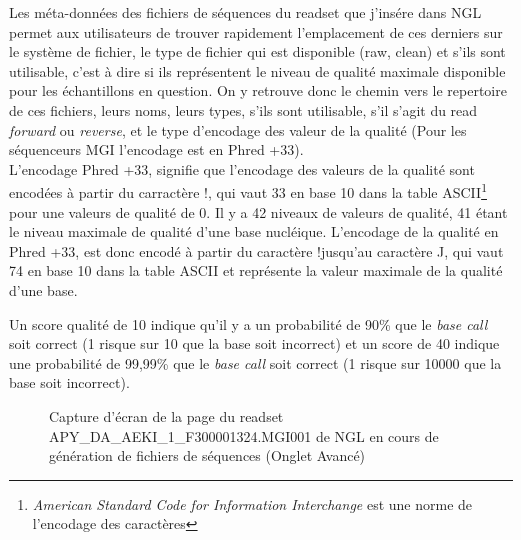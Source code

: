 Les méta-données des fichiers de séquences du readset que j'insére dans NGL permet aux utilisateurs de trouver rapidement l'emplacement de ces derniers sur le système de fichier, le type de fichier qui est disponible (\og raw\fg{}, \og clean\fg{}) et s'ils sont \og utilisable\fg{}, c'est à dire si ils représentent le niveau de qualité maximale disponible pour les échantillons en question.
On y retrouve donc le chemin vers le repertoire de ces fichiers, leurs noms, leurs types, s'ils sont utilisable, s'il s'agit du read \emph{forward} ou \emph{reverse}, et le type d'encodage des valeur de la qualité (Pour les séquenceurs MGI l'encodage est en Phred +33).\\

L'encodage Phred +33, signifie que l'encodage des valeurs de la qualité sont encodées à partir du carractère \og !\fg{}, qui vaut 33 en base 10 dans la table ASCII\footnote{\emph{American Standard Code for Information Interchange} est une norme de l'encodage des caractères} pour une valeurs de qualité de 0. Il y a 42 niveaux de valeurs de qualité, 41 étant le niveau maximale de qualité d'une base nucléique. L'encodage de la qualité en Phred +33, est donc encodé à partir du caractère \og !\fg jusqu'au caractère \og J\fg{}, qui vaut 74 en base 10 dans la table ASCII et représente la valeur maximale de la qualité d'une base.

Un score qualité de 10 indique qu'il y a un probabilité de 90\% que le \emph{base call} soit correct (1 risque sur 10 que la base soit incorrect) et un score de 40 indique une probabilité de 99,99\% que le \emph{base call} soit correct (1 risque sur 10000 que la base soit incorrect).

\begin{figure}[H]
    \centering
    \caption{\footnotesize{Capture d'écran de la page du readset APY\_DA\_AEKI\_1\_F300001324.MGI001 de NGL en cours de génération de fichiers de séquences (Onglet \og Avancé\fg{})}}
    \label{meta-data-fastq}
\end{figure}

